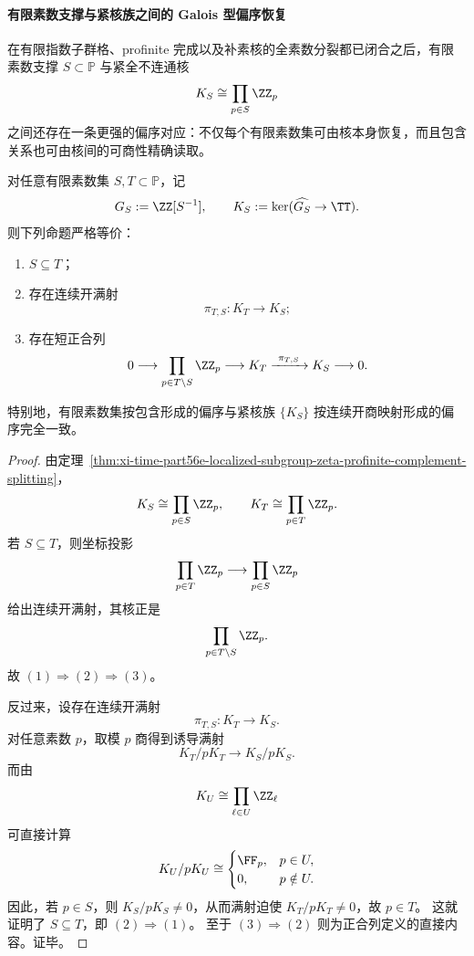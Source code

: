 \paragraph{有限素数支撑与紧核族之间的 Galois 型偏序恢复}
在有限指数子群格、profinite 完成以及补素核的全素数分裂都已闭合之后，有限素数支撑 \(S\subset\mathbb P\) 与紧全不连通核
\[
K_S\cong \prod_{p\in S}\ZZ_p
\]
之间还存在一条更强的偏序对应：不仅每个有限素数集可由核本身恢复，而且包含关系也可由核间的可商性精确读取。

\begin{theorem}\label{thm:xi-time-part56ea-prime-support-kernel-galois-correspondence}
对任意有限素数集 \(S,T\subset\mathbb P\)，记
\[
G_S:=\ZZ[S^{-1}],
\qquad
K_S:=\ker(\widehat{G_S}\to \TT).
\]
则下列命题严格等价：
\begin{enumerate}
  \item \(S\subseteq T\)；
  \item 存在连续开满射
  \[
  \pi_{T,S}:K_T\to K_S;
  \]
  \item 存在短正合列
  \[
  0\longrightarrow \prod_{p\in T\setminus S}\ZZ_p
  \longrightarrow K_T
  \xrightarrow{\ \pi_{T,S}\ }
  K_S
  \longrightarrow 0.
  \]
\end{enumerate}
特别地，有限素数集按包含形成的偏序与紧核族 \(\{K_S\}\) 按连续开商映射形成的偏序完全一致。
\end{theorem}
\begin{proof}
由定理~\ref{thm:xi-time-part56e-localized-subgroup-zeta-profinite-complement-splitting}，
\[
K_S\cong \prod_{p\in S}\ZZ_p,
\qquad
K_T\cong \prod_{p\in T}\ZZ_p.
\]
若 \(S\subseteq T\)，则坐标投影
\[
\prod_{p\in T}\ZZ_p\longrightarrow \prod_{p\in S}\ZZ_p
\]
给出连续开满射，其核正是
\[
\prod_{p\in T\setminus S}\ZZ_p.
\]
故 \((1)\Rightarrow(2)\Rightarrow(3)\)。

反过来，设存在连续开满射
\[
\pi_{T,S}:K_T\to K_S.
\]
对任意素数 \(p\)，取模 \(p\) 商得到诱导满射
\[
K_T/pK_T\longrightarrow K_S/pK_S.
\]
而由
\[
K_U\cong \prod_{\ell\in U}\ZZ_\ell
\]
可直接计算
\[
K_U/pK_U\cong
\begin{cases}
\FF_p, & p\in U,\\
0, & p\notin U.
\end{cases}
\]
因此，若 \(p\in S\)，则 \(K_S/pK_S\neq 0\)，从而满射迫使 \(K_T/pK_T\neq 0\)，故 \(p\in T\)。
这就证明了 \(S\subseteq T\)，即 \((2)\Rightarrow(1)\)。
至于 \((3)\Rightarrow(2)\) 则为正合列定义的直接内容。证毕。
\end{proof}

\endinput
